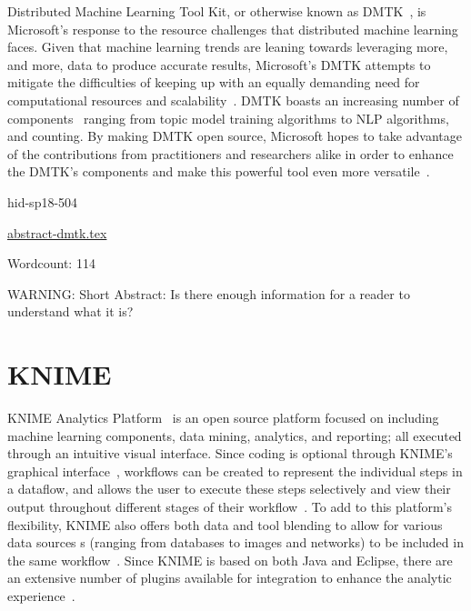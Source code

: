 Distributed Machine Learning Tool Kit, or otherwise known as 
DMTK~\cite{hid-sp18-504-dmtk}, is Microsoft's response to the resource 
challenges that distributed machine learning faces. Given that machine 
learning trends are leaning towards leveraging more, and more, data to 
produce accurate results, Microsoft's DMTK attempts to mitigate the 
difficulties of keeping up with an equally demanding need for computational 
resources and scalability~\cite{hid-sp18-504-dmtk}. DMTK boasts an increasing 
number of components~\cite{hid-sp18-504-msresearch} ranging from topic 
model training algorithms to NLP algorithms, and counting. By making 
DMTK open source, Microsoft hopes to take advantage of the contributions 
from practitioners and researchers alike in order to enhance the DMTK's 
components and make this powerful tool even more 
versatile~\cite{hid-sp18-504-msresearch}.


\begin{IU}

hid-sp18-504

\href{https://github.com/cloudmesh-community/hid-sp18-504/blob/master//technology/abstract-dmtk.tex}{abstract-dmtk.tex}

 

Wordcount: 114

WARNING: Short Abstract: Is there enough information for a reader to understand what it is?

\end{IU}

\section{KNIME}

KNIME Analytics Platform~\cite{hid-sp18-504-pred-knime} is an open source 
platform focused on including machine learning components, data mining, 
analytics, and reporting; all executed through an intuitive visual interface. 
Since coding is optional through KNIME's graphical 
interface~\cite{hid-sp18-504-knime}, workflows can be created to represent the 
individual steps in a dataflow, and allows the user to execute these steps 
selectively and view their output throughout different stages of their 
workflow~\cite{hid-sp18-504-pred-knime}. To add to this platform's flexibility,
KNIME also offers both data and tool blending to allow for various data sources
s (ranging from databases to images and networks) to be included in the same
workflow~\cite{hid-sp18-504-knime}. Since KNIME is based on both Java 
and Eclipse, there are an extensive number of plugins available for 
integration to enhance the analytic experience~\cite{hid-sp18-504-pred-knime}.


